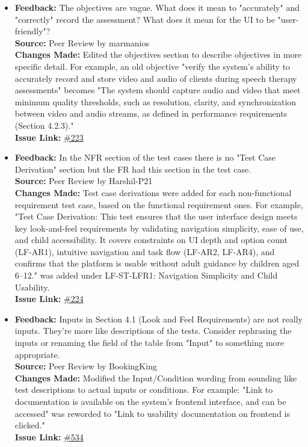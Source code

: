 \documentclass{article}
\begin{document}
\begin{itemize}
    \item 
      \textbf{Feedback:} The objectives are vague. What does it mean to "accurately" and "correctly" record the assessment? What does it mean for the UI to be "user-friendly"? \\
      \textbf{Source:} Peer Review by marmanios \\
      \textbf{Changes Made:} Edited the objectives section to describe objectives in more specific detail. For example, an old objective "verify the system's ability to accurately record and store video and audio of clients during speech therapy assessments" becomes "The system should capture audio and video that meet minimum quality thresholds, such as resolution, clarity, and synchronization between video and audio streams, as defined in performance requirements (Section 4.2.3)."\\
      \textbf{Issue Link:} \href{https://github.com/parishanizam/TeleHealth/issues/223}{\#223}

    \item 
      \textbf{Feedback:} In the NFR section of the test cases there is no "Test Case Derivation" section but the FR had this section in the test case. \\
      \textbf{Source:} Peer Review by Harshil-P21 \\
      \textbf{Changes Made:} Test case derivations were added for each non-functional requirement test case, based on the functional requirement ones. For example, "Test Case Derivation: This test ensures that the user interface design meets key look-and-feel requirements by validating navigation simplicity, ease of use, and child accessibility. It covers constraints on UI depth and option count (LF-AR1), intuitive navigation and task flow (LF-AR2, LF-AR4), and confirms that the platform is usable without adult guidance by children aged 6–12." was added under LF-ST-LFR1: Navigation Simplicity and Child Usability.\\
      \textbf{Issue Link:} \href{https://github.com/parishanizam/TeleHealth/issues/224}{\#224}

    \item 
      \textbf{Feedback:} Inputs in Section 4.1 (Look and Feel Requirements) are not really inputs. They're more like descriptions of the tests. Consider rephrasing the inputs or renaming the field of the table from "Input" to something more appropriate. \\
      \textbf{Source:} Peer Review by BookingKing \\
      \textbf{Changes Made:} Modified the Input/Condition wording from sounding like test descriptions to actual inputs or conditions. For example: "Link to documentation is available on the system's frontend interface, and can be accessed" was reworded to "Link to usability documentation on frontend is clicked." \\
      \textbf{Issue Link:} \href{https://github.com/parishanizam/TeleHealth/issues/534}{\#534}
  
\end{itemize}
\end{document}
